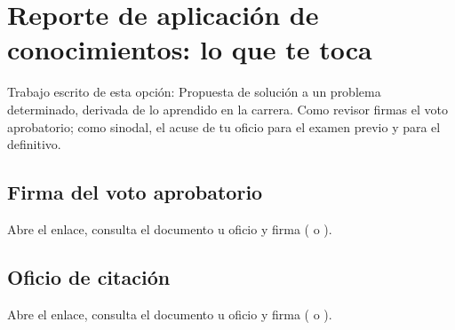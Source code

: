 \section{Reporte de aplicación de conocimientos: lo que te toca}
Trabajo escrito de esta opción: Propuesta de solución a un problema determinado, derivada de lo aprendido en la carrera. Como revisor firmas el voto aprobatorio; como sinodal, el acuse de tu oficio para el examen previo y para el definitivo.
\subsection{Firma del voto aprobatorio}
Abre el enlace, consulta el documento u oficio y firma ( o ).
\subsection{Oficio de citación}
Abre el enlace, consulta el documento u oficio y firma ( o ).
